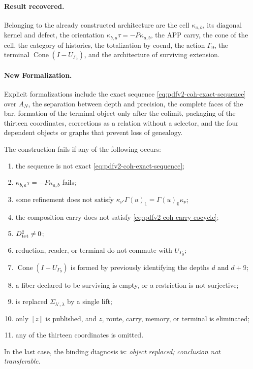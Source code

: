 \paragraph{Result recovered.}
Belonging to the already constructed architecture are the cell \(\kappa_{a,b}\), its
diagonal kernel and defect, the orientation
\(\kappa_{b,a}\tau=-P\kappa_{a,b}\), the APP carry, the cone of the cell, the
category of histories, the totalization by coend, the action \(\Gamma_9\), the
terminal \(\operatorname{Cone}(I-U_{\Gamma_9})\), and the architecture of
surviving extension.

\paragraph{New Formalization.}
Explicit formalizations include the exact sequence \eqref{eq:pdfv2-coh-exact-sequence} over \(A_N\), the separation between depth and precision, the complete faces of the bar, formation of the terminal object only after the colimit, packaging of the thirteen coordinates, corrections as a relation without a selector, and the four dependent objects or graphs that prevent loss of genealogy.

\begin{criterion}
\label{crit:pdfv2-coh-falsifiers}
The construction fails if any of the following occurs:
\begin{enumerate}
 \item the sequence is not exact
       \eqref{eq:pdfv2-coh-exact-sequence};
 \item \(\kappa_{b,a}\tau=-P\kappa_{a,b}\) fails;
 \item some refinement does not satisfy
       \(\kappa_{\nu'}\Gamma(u)_1=\Gamma(u)_0\kappa_\nu\);
 \item the composition carry does not satisfy
       \eqref{eq:pdfv2-coh-carry-cocycle};
 \item \(D_{\rm tot}^2\neq0\);
 \item reduction, reader, or terminal do not commute with \(U_{\Gamma_9}\);
 \item \(\operatorname{Cone}(I-U_{\Gamma_9})\) is formed by previously identifying
       the depths \(d\) and \(d+9\);
 \item a fiber declared to be surviving is empty, or a restriction is not
       surjective;
 \item is replaced \(\Sigma_{\lambda',\lambda}\) by a single
       lift;
 \item only \([z]\) is published, and \(z\), route, carry, memory, or
       terminal is eliminated;
 \item any of the thirteen coordinates is omitted.
\end{enumerate}
In the last case, the binding diagnosis is: \emph{object replaced;
conclusion not transferable}.
\end{criterion}

